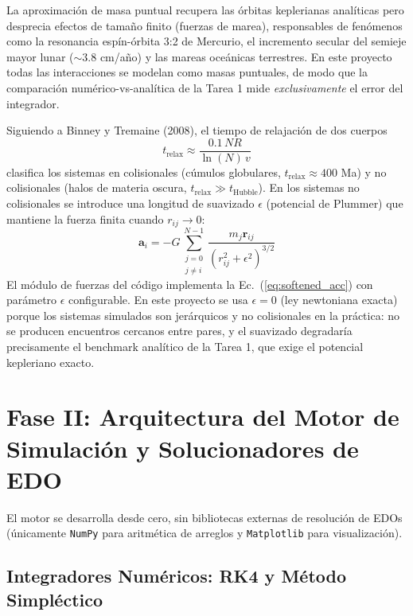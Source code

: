 \documentclass[11pt, a4paper]{article}
\begin{document}
La aproximación de masa puntual recupera las órbitas keplerianas analíticas pero desprecia efectos de tamaño finito (fuerzas de marea), responsables de fenómenos como la resonancia espín-órbita 3:2 de Mercurio, el incremento secular del semieje mayor lunar ($\sim 3.8$ cm/año) y las mareas oceánicas terrestres. En este proyecto todas las interacciones se modelan como masas puntuales, de modo que la comparación numérico-vs-analítica de la Tarea 1 mide \emph{exclusivamente} el error del integrador.

Siguiendo a Binney y Tremaine (2008), el tiempo de relajación de dos cuerpos
\begin{equation}
	t_{\text{relax}} \approx \frac{0.1\, N R}{\ln(N)\, v}
	\label{eq:t_relax}
\end{equation}
clasifica los sistemas en colisionales (cúmulos globulares, $t_{\text{relax}} \approx 400$ Ma) y no colisionales (halos de materia oscura, $t_{\text{relax}} \gg t_{\text{Hubble}}$). En los sistemas no colisionales se introduce una longitud de suavizado $\epsilon$ (potencial de Plummer) que mantiene la fuerza finita cuando $r_{ij} \to 0$:
\begin{equation}
	\mathbf{a}_i = -G \sum_{\substack{j=0 \\ j \neq i}}^{N-1} \frac{m_j \mathbf{r}_{ij}}{\left(r_{ij}^2 + \epsilon^2\right)^{3/2}}
	\label{eq:softened_acc}
\end{equation}
El módulo de fuerzas del código implementa la Ec.~(\ref{eq:softened_acc}) con parámetro $\epsilon$ configurable. En este proyecto se usa $\epsilon = 0$ (ley newtoniana exacta) porque los sistemas simulados son jerárquicos y no colisionales en la práctica: no se producen encuentros cercanos entre pares, y el suavizado degradaría precisamente el benchmark analítico de la Tarea 1, que exige el potencial kepleriano exacto.

\section{Fase II: Arquitectura del Motor de Simulación y Solucionadores de EDO}

El motor se desarrolla desde cero, sin bibliotecas externas de resolución de EDOs (únicamente \texttt{NumPy} para aritmética de arreglos y \texttt{Matplotlib} para visualización).

\subsection{Integradores Numéricos: RK4 y Método Simpléctico}
\end{document}
